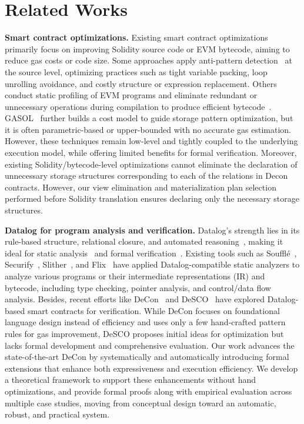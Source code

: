 \section{Related Works}
\noindent \textbf{Smart contract optimizations.} Existing smart contract optimizations primarily focus on improving Solidity source code or EVM bytecode, aiming to reduce gas costs or code size. 
Some approaches apply anti-pattern detection~\cite{Feist2019Slither, nagele2020blockchain, chen2017under} at the source level, optimizing practices such as tight variable packing, loop unrolling avoidance, and costly structure or expression replacement.
Others conduct static profiling of EVM programs and eliminate redundant or unnecessary operations during compilation to produce efficient bytecode~\cite{albert2022super, correas2021static}.
GASOL~\cite{albert2020gasol} further builds a cost model to guide storage pattern optimization, but it is often parametric-based or upper-bounded with no accurate gas estimation. 
However, these techniques remain low-level and tightly coupled to the underlying execution model, while offering limited benefits for formal verification. 
Moreover, existing Solidity/bytecode-level optimizations cannot eliminate the declaration of unnecessary storage structures corresponding to each of the relations in Decon~\cite{chen2022declarative} contracts. However, our view elimination and materialization plan selection performed before Solidity translation ensures declaring only the necessary storage structures.

\smallskip
\noindent \textbf{Datalog for program analysis and verification.} 
Datalog’s strength lies in its rule-based structure, relational closure, and automated reasoning~\cite{ceri1989you, bellomarini2018vadalog}, making it ideal for static analysis~\cite{Durieux2020Review} and formal verification~\cite{bembenek2020formulog, gottlob2002datalog}.
Existing tools such as Soufflé~\cite{jordan2016souffle}, Securify~\cite{Tsankov2018Securify}, Slither~\cite{Feist2019Slither}, and Flix~\cite{madsen2016datalog} have applied Datalog-compatible static analyzers to analyze various programs or their intermediate representations (IR) and bytecode, including type checking, pointer analysis, and control/data flow analysis.
Besides, recent efforts like DeCon~\cite{chen2022declarative} and DeSCO~\cite{lu2024practical} have explored Datalog-based smart contracts for verification. 
While DeCon focuses on foundational language design instead of efficiency and uses only a few hand-crafted pattern rules for gas improvement, DeSCO proposes initial ideas for optimization but lacks formal development and comprehensive evaluation.
Our work advances the state-of-the-art DeCon by systematically and automatically introducing formal extensions that enhance both expressiveness and execution efficiency. We develop a theoretical framework to support these enhancements without hand optimizations, and provide formal proofs along with empirical evaluation across multiple case studies, moving from conceptual design toward an automatic, robust, and practical system.


